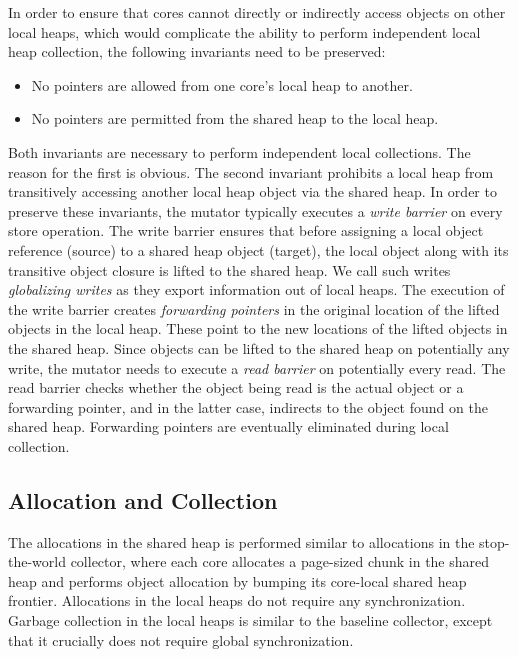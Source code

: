 In order to ensure that cores cannot directly or indirectly access objects on
other local heaps, which would complicate the ability to perform independent
local heap collection, the following invariants need to be preserved:

\begin{itemize}
\item No pointers are allowed from one core's local heap to another.
\item No pointers are permitted from the shared heap to the local heap.
\end{itemize}

\noindent Both invariants are necessary to perform independent local
collections.  The reason for the first is obvious.  The second invariant
prohibits a local heap from transitively accessing another local heap object
via the shared heap.  In order to preserve these invariants, the mutator
typically executes a \emph{write barrier} on every store operation. The write
barrier ensures that before assigning a local object reference (source) to a
shared heap object (target), the local object along with its transitive object
closure is lifted to the shared heap. We call such writes \emph{globalizing
writes} as they export information out of local heaps.  The execution of the
write barrier creates \emph{forwarding pointers} in the original location of
the lifted objects in the local heap. These point to the new locations of the
lifted objects in the shared heap. Since objects can be lifted to the shared
heap on potentially any write, the mutator needs to execute a \emph{read
barrier} on potentially every read. The read barrier checks whether the object
being read is the actual object or a forwarding pointer, and in the latter
case, indirects to the object found on the shared heap.  Forwarding pointers
are eventually eliminated during local collection.

\subsection{Allocation and Collection}

The allocations in the shared heap is performed similar to allocations in the
stop-the-world collector, where each core allocates a page-sized chunk in the
shared heap and performs object allocation by bumping its core-local shared
heap frontier. Allocations in the local heaps do not require any
synchronization. Garbage collection in the local heaps is similar to the
baseline collector, except that it crucially does not require global
synchronization.

